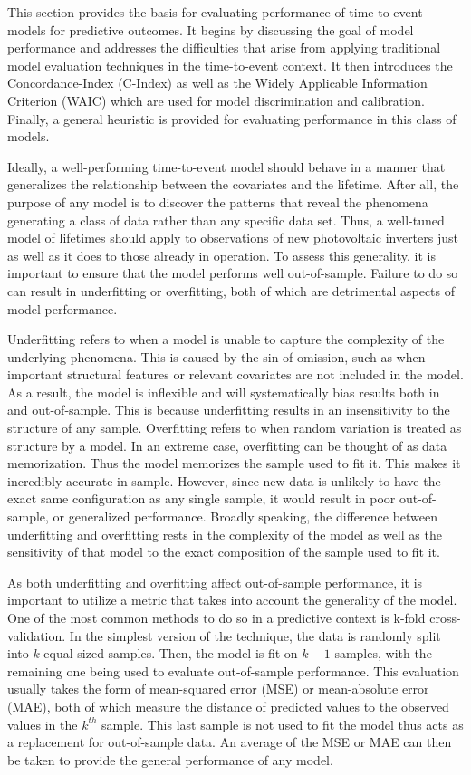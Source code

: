 This section provides the basis for evaluating performance of time-to-event models for predictive outcomes. It begins by discussing the goal of model performance and addresses the difficulties that arise from applying traditional model evaluation techniques in the time-to-event context. It then introduces the Concordance-Index (C-Index) as well as the Widely Applicable Information Criterion (WAIC) which are used for model discrimination and calibration. Finally, a general heuristic is provided for evaluating performance in this class of models.

Ideally, a well-performing time-to-event model should behave in a manner that generalizes the relationship between the covariates and the lifetime. After all, the purpose of any model is to discover the patterns that reveal the phenomena generating a class of data rather than any specific data set. Thus, a well-tuned model of lifetimes should apply to observations of new photovoltaic inverters just as well as it does to those already in operation. To assess this generality, it is important to ensure that the model performs well out-of-sample. Failure to do so can result in underfitting or overfitting, both of which are detrimental aspects of model performance. 

Underfitting refers to when a model is unable to capture the complexity of the underlying phenomena. This is caused by the sin of omission, such as when important structural features or relevant covariates are not included in the model. As a result, the model is inflexible and will systematically bias results both in and out-of-sample. This is because underfitting results in an insensitivity to the structure of any sample. Overfitting refers to when random variation is treated as structure by a model. In an extreme case, overfitting can be thought of as data memorization. Thus the model memorizes the sample used to fit it. This makes it incredibly accurate in-sample. However, since new data is unlikely to have the exact same configuration as any single sample, it would result in poor out-of-sample, or generalized performance. Broadly speaking, the difference between underfitting and overfitting rests in the complexity of the model as well as the sensitivity of that model to the exact composition of the sample used to fit it\cite{McElreath2016}. 



As both underfitting and overfitting affect out-of-sample performance, it is important to utilize a metric that takes into account the generality of the model. One of the most common methods to do so in a predictive context is k-fold cross-validation. In the simplest version of the technique, the data is randomly split into $k$ equal sized samples. Then, the model is fit on $k-1$ samples, with the remaining one being used to evaluate out-of-sample performance. This evaluation usually takes the form of mean-squared error (MSE) or mean-absolute error (MAE), both of which measure the distance of predicted values to the observed values in the $k^{th}$ sample. This last sample is not used to fit the model thus acts as a replacement for out-of-sample data. An average of the MSE or MAE can then be taken to provide the general performance of any model. 

